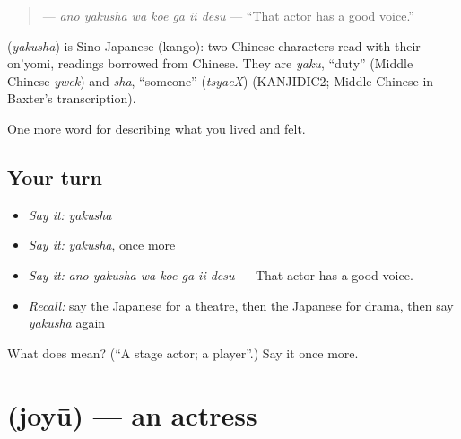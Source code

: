 \begin{quote}
\textbf{   } — \emph{ano yakusha wa koe ga ii desu} — \textquotedblleft{}That actor has a good voice.\textquotedblright{}
\end{quote}

\begin{cousinweb}
\textbf{} (\emph{yakusha}) is Sino-Japanese (kango): two Chinese characters read with their on'yomi, readings borrowed from Chinese. They are \emph{yaku}, \textquotedblleft{}duty\textquotedblright{} (Middle Chinese \emph{ywek}) and \emph{sha}, \textquotedblleft{}someone\textquotedblright{} (\emph{tsyaeX}) (KANJIDIC2; Middle Chinese in Baxter's transcription).
\end{cousinweb}

\begin{grammarlens}[title={What you've built}]
One more word for describing what you lived and felt.
\end{grammarlens}

\subsection*{Your turn}
\begin{itemize}
\raggedright
  \item \emph{Say it:} \emph{yakusha}
  \item \emph{Say it:} \emph{yakusha}, once more
  \item \emph{Say it:} \emph{ano yakusha wa koe ga ii desu} — That actor has a good voice.
  \item \emph{Recall:} say the Japanese for a theatre, then the Japanese for drama, then say \emph{yakusha} again
\end{itemize}

\begin{tcolorbox}[breakable,colback=teal!4,colframe=teal!35!black,title={Before you move on}]
What does  mean? (\textquotedblleft{}A stage actor; a player\textquotedblright{}.) Say it once more.
\end{tcolorbox}
\section[\texorpdfstring{\ja{じょゆう} (joyū)}{じょゆう (joyū)}]{ (joyū) — an actress}

\label{lesson:JA-C502-joyuu}



